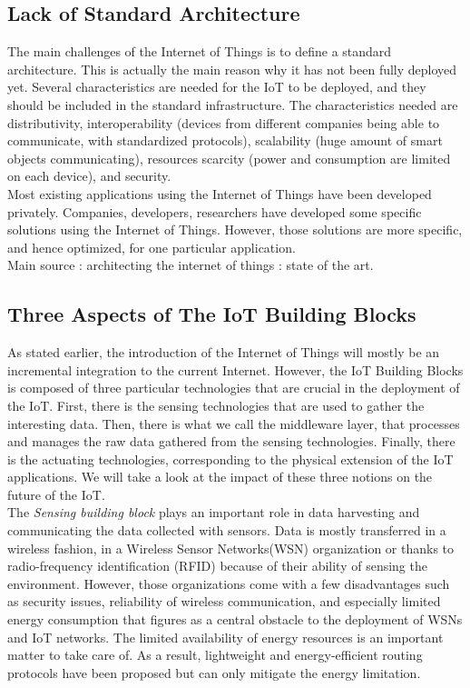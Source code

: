 \subsection{Lack of Standard Architecture}

The main challenges of the Internet of Things is to define a standard architecture. This is actually the main reason why it has not been fully deployed yet. Several characteristics are needed for the IoT to be deployed, and they should be included in the standard infrastructure. The characteristics needed are distributivity, interoperability (devices from different companies being able to communicate, with standardized protocols), scalability (huge amount of smart objects communicating), resources scarcity (power and consumption are limited on each device), and security.\\

Most existing applications using the Internet of Things have been developed privately. Companies, developers, researchers have developed some specific solutions using the Internet of Things. However, those solutions are more specific, and hence optimized, for one particular application.\\


Main source : architecting the internet of things : state of the art.\\

\subsection{Three Aspects of The IoT Building Blocks}

As stated earlier, the introduction of the Internet of Things will mostly be an incremental integration to the current Internet. However, the IoT Building Blocks is composed of three particular technologies that are crucial in the deployment of the IoT. First, there is the sensing technologies that are used to gather the interesting data. Then, there is what we call the middleware layer, that processes and manages the raw data gathered from the sensing technologies. Finally, there is the actuating technologies, corresponding to the physical extension of the IoT applications. We will take a look at the impact of these three notions on the future of the IoT.\\

The \textit{Sensing building block} plays an important role in data harvesting and communicating the data collected with sensors. Data is mostly transferred in a wireless fashion, in a Wireless Sensor Networks(WSN) organization or thanks to radio-frequency identification (RFID) because of their ability of sensing the environment. However, those organizations come with a few disadvantages such as security issues, reliability of wireless communication, and especially limited energy consumption that figures as a central obstacle to the deployment of WSNs and IoT networks. The limited availability of energy resources is an important matter to take care of. As a result, lightweight and energy-efficient routing protocols have been proposed but can only mitigate the energy limitation. \\

